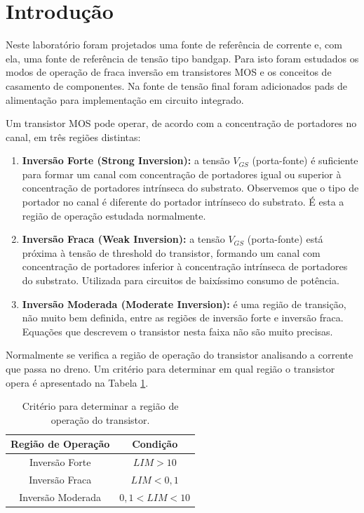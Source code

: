﻿\documentclass[12pt,a4paper]{article}
\begin{document}
\newpage
\tableofcontents
\newpage

\section*{Introdução}

Neste laboratório foram projetados uma fonte de referência de corrente e, com ela, uma fonte de referência de tensão tipo bandgap. Para isto foram estudados os modos de operação de fraca inversão em transistores MOS e os conceitos de casamento de componentes. Na fonte de tensão final foram adicionados pads de alimentação para implementação em circuito integrado.

Um transistor MOS pode operar, de acordo com a concentração de portadores no canal, em três regiões distintas:

\begin{enumerate}
    \item \textbf{Inversão Forte (Strong Inversion):} a tensão $V_{GS}$ (porta-fonte) é suficiente para formar um canal com concentração de portadores igual ou superior à concentração de portadores intrínseca do substrato. Observemos que o tipo de portador no canal é diferente do portador intrínseco do substrato. É esta a região de operação estudada normalmente.

    \item \textbf{Inversão Fraca (Weak Inversion):} a tensão $V_{GS}$ (porta-fonte) está próxima à tensão de threshold do transistor, formando um canal com concentração de portadores inferior à concentração intrínseca de portadores do substrato. Utilizada para circuitos de baixíssimo consumo de potência.

    \item \textbf{Inversão Moderada (Moderate Inversion):} é uma região de transição, não muito bem definida, entre as regiões de inversão forte e inversão fraca. Equações que descrevem o transistor nesta faixa não são muito precisas.
\end{enumerate}

Normalmente se verifica a região de operação do transistor analisando a corrente que passa no dreno. Um critério para determinar em qual região o transistor opera é apresentado na Tabela \ref{tab:operacao}.

\begin{table}[H]
\centering
\caption{Critério para determinar a região de operação do transistor.}
\label{tab:operacao}
\begin{tabular}{cc}
\toprule
\textbf{Região de Operação} & \textbf{Condição} \\
\midrule
Inversão Forte & $LIM > 10$ \\
Inversão Fraca & $LIM < 0,1$ \\
Inversão Moderada & $0,1 < LIM < 10$ \\
\bottomrule
\end{tabular}
\end{table}
\end{document}
